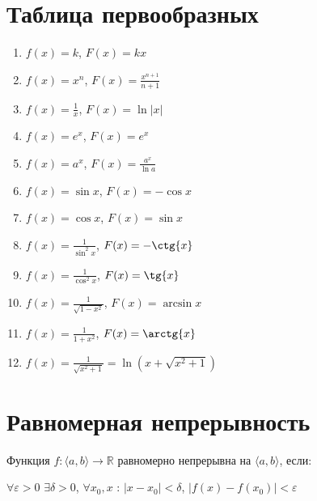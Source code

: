 \documentclass{article}
\begin{document}
	\section{Таблица первообразных}
		
		\begin{enumerate}
			
			\item $f(x) = k$, $F(x) = kx$
				
			\item $f(x) = x^n$, $F(x) = \frac{x^{n + 1}}{n + 1}$
				
			\item $f(x) = \frac{1}{x}$, $F(x) = \ln |x|$
				
			\item $f(x) = e^x$, $F(x) = e^x$
				
			\item $f(x) = a^x$, $F(x) = \frac{a^x}{\ln a}$
				
			\item $f(x) = \sin{x}$, $F(x) = -\cos{x}$
				
			\item $f(x) = \cos{x}$, $F(x) = \sin{x}$
				
			\item $f(x) = \frac{1}{\sin^2{x}}$, $F(x) = -\ctg{x}$
				
			\item $f(x) = \frac{1}{\cos^2{x}}$, $F(x) = \tg{x}$
				
			\item $f(x) = \frac{1}{\sqrt{1 - x^2}}$, $F(x) = \arcsin{x}$
				
			\item $f(x) = \frac{1}{1 + x^2}$, $F(x) = \arctg{x}$
			
			\item $f(x) = \frac{1}{\sqrt{x^2 + 1}} = \ln (x + \sqrt{x^2 + 1})$
			
				
		\end{enumerate}
			
	\newpage
		
	\section{Равномерная непрерывность}
		
		Функция $f : \langle a, b \rangle \rightarrow \mathbb{R}$ равномерно непрерывна на $\langle a, b \rangle$, если:
			
		$\forall \varepsilon > 0$ $\exists \delta > 0$, $\forall x_0, x$ : $|x - x_0| < \delta$, $|f(x) - f(x_0)| < \varepsilon$
			
\end{document}
